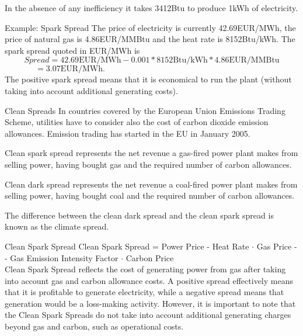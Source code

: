 	In the absence of any inefficiency it takes 3412Btu to produce 1kWh of electricity.





{Example: Spark Spread}
The price of electricity is currently 42.69EUR/MWh, the price of natural gas is 4.86EUR/MMBtu and the heat rate is 8152Btu/kWh. The spark spread quoted in EUR/MWh is
$$Spread=42.69\text{EUR/MWh}-0.001\ast8152\text{Btu/kWh}\ast4.86\text{EUR/MMBtu}$$
$\,\qquad\quad\;\;=3.07\text{EUR/MWh}.$\\
\vspace{0.2cm}
The positive spark spread means that it is economical to run the plant (without taking into account additional generating costs).


{Clean Spreads}
In countries covered by the European Union Emissions Trading Scheme, utilities have to consider also the cost of carbon dioxide emission allowances. Emission trading has started in the EU in January 2005.






	Clean spark spread represents the net revenue a gas-fired power plant makes from selling power, having bought gas and the required number of carbon allowances.


	Clean dark spread represents the net revenue a coal-fired power plant makes from selling power, having bought coal and the required number of carbon allowances.


	The difference between the clean dark spread and the clean spark spread is known as the climate spread.





{Clean Spark Spread}
Clean Spark Spread = Power Price - Heat Rate $\cdot$ Gas Price -\\- Gas Emission Intensity Factor $\cdot$ Carbon Price\\
  \vspace{0.6cm}
Clean Spark Spread reflects the cost of generating power from gas after taking into account gas and carbon allowance costs. A positive spread effectively means that it is profitable to generate electricity, while a negative spread means that generation would be a loss-making activity. However, it is important to note that the Clean Spark Spreads do not take into account additional generating charges beyond gas and carbon, such as operational costs.

